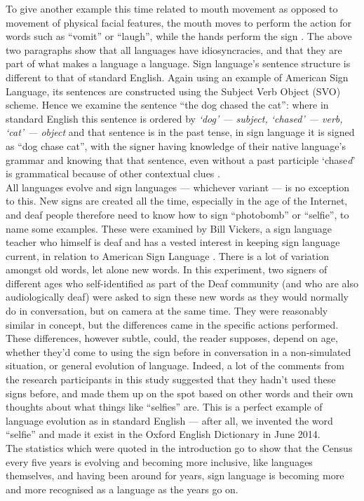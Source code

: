 \documentclass[12pt]{article}
\begin{document}
To give another example this time related to mouth movement as opposed
to movement of physical facial features, the mouth moves to perform
the action for words such as ``vomit'' or ``laugh'', while the hands
perform the sign \citep[p.\ 84]{linguistics-of-bsl}. The above two
paragraphs show that all languages have idiosyncracies, and that they
are part of what makes a language a language. Sign language's sentence
structure is different to that of standard English. Again using an
example of American Sign Language, its sentences are constructed using
the Subject Verb Object (SVO) scheme. Hence we examine the sentence
``the dog chased the cat'': where in standard English this sentence is
ordered by \textit{`dog' --- subject, `chased' --- verb, `cat' ---
object} and that sentence is in the past tense, in sign language it is
signed as ``dog chase cat'', with the signer having knowledge of their
native language's grammar and knowing that that sentence, even without
a past participle `chase\textit{d}' is grammatical because of other
contextual clues \citep{linguistics-of-bsl}.\\

All languages evolve and sign languages --- whichever variant --- is
no exception to this. New signs are created all the time, especially
in the age of the Internet, and deaf people therefore need to know how
to sign ``photobomb'' or ``selfie'', to name some examples. These were
examined by Bill Vickers, a sign language teacher who himself is deaf
and has a vested interest in keeping sign language current, in
relation to American Sign Language \citep{asl-internet-slang}. There
is a lot of variation amongst old words, let alone new words. In this
experiment, two signers of different ages who self-identified as part
of the Deaf community (and who are also audiologically deaf) were
asked to sign these new words as they would normally do in
conversation, but on camera at the same time. They were reasonably
similar in concept, but the differences came in the specific actions
performed. These differences, however subtle, could, the reader
supposes, depend on age, whether they'd come to using the sign before
in conversation in a non-simulated situation, or general evolution of
language. Indeed, a lot of the comments from the research participants
in this study suggested that they hadn't used these signs before, and
made them up on the spot based on other words and their own thoughts
about what things like ``selfies'' are. This is a perfect example of
language evolution as in standard English --- after all, we
invented the word ``selfie'' and made it exist in the Oxford English
Dictionary in June 2014.\\

The statistics which were quoted in the introduction go to show that
the Census every five years is evolving and becoming more inclusive,
like languages themselves, and having been around for years, sign
language is becoming more and more recognised as a language as the years
go on.



\end{document}
